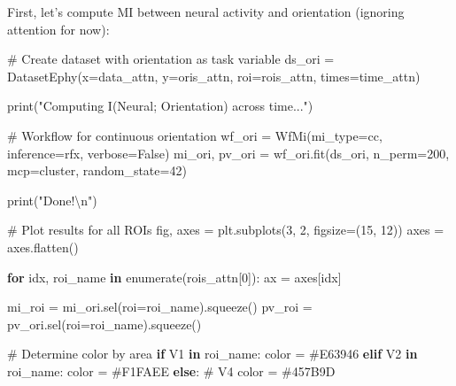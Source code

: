 \documentclass[
  11pt,
  letterpaper,
  oneside,
  openany]{book}
\newenvironment{Shaded}{\begin{snugshade}}{\end{snugshade}}
\newcommand{\BuiltInTok}[1]{\textcolor[rgb]{0.00,0.23,0.31}{#1}}
\newcommand{\CharTok}[1]{\textcolor[rgb]{0.13,0.47,0.30}{#1}}
\newcommand{\CommentTok}[1]{\textcolor[rgb]{0.37,0.37,0.37}{#1}}
\newcommand{\ControlFlowTok}[1]{\textcolor[rgb]{0.00,0.23,0.31}{\textbf{#1}}}
\newcommand{\DecValTok}[1]{\textcolor[rgb]{0.68,0.00,0.00}{#1}}
\newcommand{\KeywordTok}[1]{\textcolor[rgb]{0.00,0.23,0.31}{\textbf{#1}}}
\newcommand{\NormalTok}[1]{\textcolor[rgb]{0.00,0.23,0.31}{#1}}
\newcommand{\OperatorTok}[1]{\textcolor[rgb]{0.37,0.37,0.37}{#1}}
\newcommand{\StringTok}[1]{\textcolor[rgb]{0.13,0.47,0.30}{#1}}
\newcommand{\VariableTok}[1]{\textcolor[rgb]{0.07,0.07,0.07}{#1}}
\begin{document}
First, let's compute MI between neural activity and orientation
(ignoring attention for now):

\begin{Shaded}
\begin{Highlighting}[]
\CommentTok{\# Create dataset with orientation as task variable}
\NormalTok{ds\_ori }\OperatorTok{=}\NormalTok{ DatasetEphy(x}\OperatorTok{=}\NormalTok{data\_attn, y}\OperatorTok{=}\NormalTok{oris\_attn, roi}\OperatorTok{=}\NormalTok{rois\_attn, times}\OperatorTok{=}\NormalTok{time\_attn)}

\BuiltInTok{print}\NormalTok{(}\StringTok{"Computing I(Neural; Orientation) across time..."}\NormalTok{)}

\CommentTok{\# Workflow for continuous orientation}
\NormalTok{wf\_ori }\OperatorTok{=}\NormalTok{ WfMi(mi\_type}\OperatorTok{=}\StringTok{\textquotesingle{}cc\textquotesingle{}}\NormalTok{, inference}\OperatorTok{=}\StringTok{\textquotesingle{}rfx\textquotesingle{}}\NormalTok{, verbose}\OperatorTok{=}\VariableTok{False}\NormalTok{)}
\NormalTok{mi\_ori, pv\_ori }\OperatorTok{=}\NormalTok{ wf\_ori.fit(ds\_ori, n\_perm}\OperatorTok{=}\DecValTok{200}\NormalTok{, mcp}\OperatorTok{=}\StringTok{\textquotesingle{}cluster\textquotesingle{}}\NormalTok{, random\_state}\OperatorTok{=}\DecValTok{42}\NormalTok{)}

\BuiltInTok{print}\NormalTok{(}\StringTok{"Done!}\CharTok{\textbackslash{}n}\StringTok{"}\NormalTok{)}

\CommentTok{\# Plot results for all ROIs}
\NormalTok{fig, axes }\OperatorTok{=}\NormalTok{ plt.subplots(}\DecValTok{3}\NormalTok{, }\DecValTok{2}\NormalTok{, figsize}\OperatorTok{=}\NormalTok{(}\DecValTok{15}\NormalTok{, }\DecValTok{12}\NormalTok{))}
\NormalTok{axes }\OperatorTok{=}\NormalTok{ axes.flatten()}

\ControlFlowTok{for}\NormalTok{ idx, roi\_name }\KeywordTok{in} \BuiltInTok{enumerate}\NormalTok{(rois\_attn[}\DecValTok{0}\NormalTok{]):}
\NormalTok{    ax }\OperatorTok{=}\NormalTok{ axes[idx]}
    
\NormalTok{    mi\_roi }\OperatorTok{=}\NormalTok{ mi\_ori.sel(roi}\OperatorTok{=}\NormalTok{roi\_name).squeeze()}
\NormalTok{    pv\_roi }\OperatorTok{=}\NormalTok{ pv\_ori.sel(roi}\OperatorTok{=}\NormalTok{roi\_name).squeeze()}
    
    \CommentTok{\# Determine color by area}
    \ControlFlowTok{if} \StringTok{\textquotesingle{}V1\textquotesingle{}} \KeywordTok{in}\NormalTok{ roi\_name:}
\NormalTok{        color }\OperatorTok{=} \StringTok{\textquotesingle{}\#E63946\textquotesingle{}}
    \ControlFlowTok{elif} \StringTok{\textquotesingle{}V2\textquotesingle{}} \KeywordTok{in}\NormalTok{ roi\_name:}
\NormalTok{        color }\OperatorTok{=} \StringTok{\textquotesingle{}\#F1FAEE\textquotesingle{}}
    \ControlFlowTok{else}\NormalTok{:  }\CommentTok{\# V4}
\NormalTok{        color }\OperatorTok{=} \StringTok{\textquotesingle{}\#457B9D\textquotesingle{}}
    

\end{Highlighting}
\end{Shaded}
\end{document}

